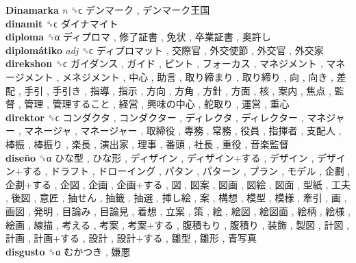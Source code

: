 \textbf{Dinamarka} \emph{n}  ␝ϲ   デンマーク ,  デンマーク王国   \\
\textbf{dinamit} ␝ϲ   ダイナマイト   \\
\textbf{diploma} ␝α   ディプロマ ,  修了証書 ,  免状 ,  卒業証書 ,  奥許し   \\
\textbf{diplomátiko} \emph{adj}  ␝ϲ   ディプロマット ,  交際官 ,  外交使節 ,  外交官 ,  外交家   \\
\textbf{direkshon} ␝ϲ   ガイダンス ,  ガイド ,  ピント ,  フォーカス ,  マネジメント ,  マネージメント ,  メネジメント ,  中心 ,  助言 ,  取り締まり ,  取り締り ,  向 ,  向き ,  差配 ,  手引 ,  手引き ,  指導 ,  指示 ,  方向 ,  方角 ,  方針 ,  方面 ,  核 ,  案内 ,  焦点 ,  監督 ,  管理 ,  管理すること ,  経営 ,  興味の中心 ,  舵取り ,  運営 ,  重心   \\
\textbf{direktor} ␝ϲ   コンダクタ ,  コンダクター ,  ディレクタ ,  ディレクター ,  マネジャー ,  マネージャ ,  マネージャー ,  取締役 ,  専務 ,  常務 ,  役員 ,  指揮者 ,  支配人 ,  棒振 ,  棒振り ,  楽長 ,  演出家 ,  理事 ,  番頭 ,  社長 ,  重役 ,  音楽監督   \\
\textbf{diseño} ␝α   ひな型 ,  ひな形 ,  ディザイン ,  ディザイン+する ,  デザイン ,  デザイン+する ,  ドラフト ,  ドローイング ,  パタン ,  パターン ,  プラン ,  モデル ,  企劃 ,  企劃+する ,  企図 ,  企画 ,  企画+する ,  図 ,  図案 ,  図画 ,  図絵 ,  図面 ,  型紙 ,  工夫 ,  後図 ,  意匠 ,  抽せん ,  抽籤 ,  抽選 ,  挿し絵 ,  案 ,  構想 ,  模型 ,  模様 ,  牽引 ,  画 ,  画図 ,  発明 ,  目論み ,  目論見 ,  着想 ,  立案 ,  策 ,  絵 ,  絵図 ,  絵図面 ,  絵柄 ,  絵様 ,  絵画 ,  線描 ,  考える ,  考案 ,  考案+する ,  腹積もり ,  腹積り ,  装飾 ,  製図 ,  計図 ,  計画 ,  計画+する ,  設計 ,  設計+する ,  雛型 ,  雛形 ,  青写真   \\
\textbf{disgusto} ␝α   むかつき ,  嫌悪   \\
